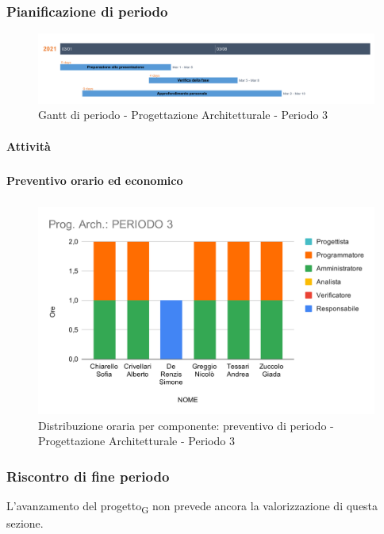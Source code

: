 \subsubsection{Pianificazione di periodo}


\begin{figure}[H]
	\centering
	\includegraphics[scale=0.30]{res/images/gantt_periodo/progarch_3_gantt.png}
	\caption{Gantt di periodo - Progettazione Architetturale - Periodo 3}
\end{figure}

\paragraph{Attività}
\subparagraph*{}

\planningTable{
	
}



\paragraph{Preventivo orario ed economico}
\subparagraph*{}

\contabilitaTable{
	
}

\begin{figure}[H]
	\centering
	\includegraphics[scale=2]{res/images/charts/preventivo/prog_arch_3.png}
	\caption{Distribuzione oraria per componente: preventivo di periodo - Progettazione Architetturale - Periodo 3}
\end{figure}

\subsubsection{Riscontro di fine periodo}


L'avanzamento del progetto\textsubscript{G} non prevede ancora la valorizzazione di questa sezione.